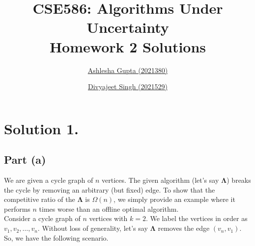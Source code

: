 \documentclass[11pt]{article}
\title{
    \textbf{CSE586: Algorithms Under Uncertainty} \\
    Homework 2 Solutions %
}
\author{
    \href{mailto:ashlesha21380@iiitd.ac.in}{Ashlesha Gupta (2021380)} \and
    \href{mailto:divyajeet21529@iiitd.ac.in}{Divyajeet Singh (2021529)}
}
\date{}
\begin{document}
\maketitle

\section*{Solution 1.}

\subsection*{Part (a)}
We are given a cycle graph of $n$ vertices. The given algorithm (let's say
$\mathbf{\Lambda}$) breaks the cycle by removing an arbitrary (but fixed) edge. To show that the competitive ratio
of the $\mathbf{\Lambda}$ is $\Omega(n)$, we simply provide an example where it performs
$n$ times worse than an offline optimal algorithm. \\
Consider a cycle graph of $n$ vertices with $k = 2$. We label the vertices in order
as $v_{1}, v_{2}, \ldots, v_{n}$. Without loss of generality, let's say $\mathbf{\Lambda}$ removes the edge $(v_{n}, v_{1})$. So, we have the following scenario.
\end{document}
